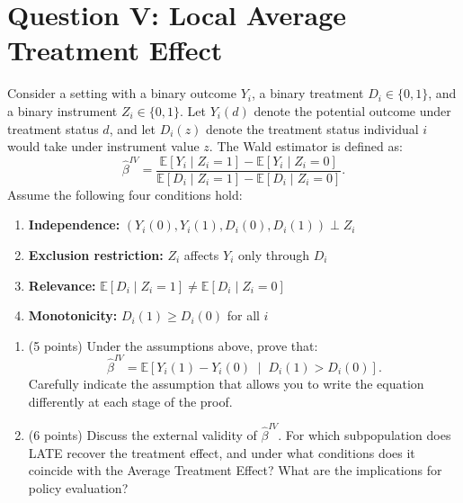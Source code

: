 \documentclass[letterpaper,12pt]{article}
\theoremstyle{dotlessS}
\begin{document}
\section*{Question V: Local Average Treatment Effect}

Consider a setting with a binary outcome $Y_i$, a binary treatment $D_i \in \{0,1\}$, and a binary instrument $Z_i \in \{0,1\}$. Let $Y_i(d)$ denote the potential outcome under treatment status $d$, and let $D_i(z)$ denote the treatment status individual $i$ would take under instrument value $z$. The Wald estimator is defined as:
\begin{equation*}
    \hat{\beta}^{IV} = \frac{\mathbb{E}[Y_i \mid Z_i = 1] - \mathbb{E}[Y_i \mid Z_i = 0]}{\mathbb{E}[D_i \mid Z_i = 1] - \mathbb{E}[D_i \mid Z_i = 0]}.
\end{equation*}
Assume the following four conditions hold:
\begin{enumerate}[label=(\roman*)]
    \item \textbf{Independence:} $(Y_i(0), Y_i(1), D_i(0), D_i(1)) \perp Z_i$
    \item \textbf{Exclusion restriction:} $Z_i$ affects $Y_i$ only through $D_i$
    \item \textbf{Relevance:} $\mathbb{E}[D_i \mid Z_i=1] \neq \mathbb{E}[D_i \mid Z_i=0]$
    \item \textbf{Monotonicity:} $D_i(1) \geq D_i(0)$ for all $i$
\end{enumerate}

\begin{enumerate}[label=(\alph*)]

\item (5 points) Under the assumptions above, prove that:
\begin{equation*}
    \hat{\beta}^{IV} = \mathbb{E}\!\left[Y_i(1) - Y_i(0) \;\middle|\; D_i(1) > D_i(0)\right].
\end{equation*}
Carefully indicate the assumption that allows you to write the equation differently at each stage of the proof.

\item (6 points) Discuss the external validity of $\hat{\beta}^{IV}$. For which subpopulation does LATE recover the treatment effect, and under what conditions does it coincide with the Average Treatment Effect? What are the implications for policy evaluation?

\end{enumerate}
\end{document}
